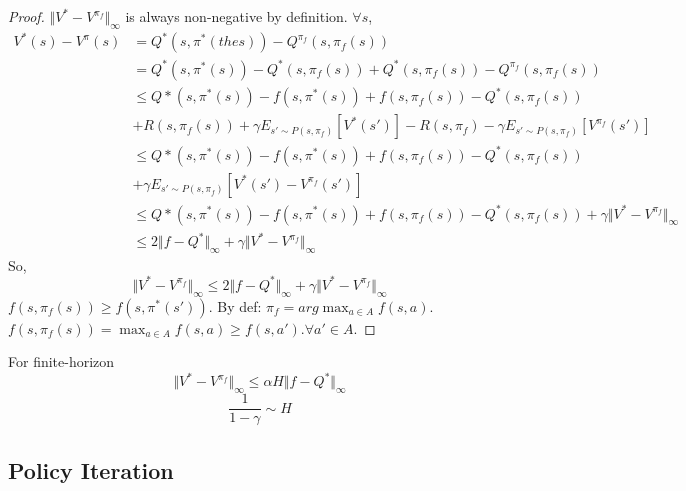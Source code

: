 \documentclass{report}
\begin{document}
\begin{proof}
$\Vert V^*-V^{\pi_f}\Vert_{\infty}$ is always non-negative by definition. $\forall s$, 
\begin{equation*}
\begin{split}
V^{*}(s)-V^{\pi}(s) &= Q^*(s,\pi^*(the s))-Q^{\pi_f}(s,\pi_f(s))\\
&= Q^*(s,\pi^*(s))-Q^*(s,\pi_f(s))+Q^*(s,\pi_f(s))-Q^{\pi_f}(s,\pi_f(s))\\
&\leq Q*(s,\pi^{*}(s))-f(s,\pi^{*}(s))+f(s,\pi_f(s))-Q^*(s,\pi_f(s))\\
& +R(s,\pi_f(s))+\gamma E_{s'\sim P(s,\pi_f)}[V^*(s')]-R(s,\pi_f) - \gamma E_{s'\sim P(s,\pi_f)}[V^{\pi_f}(s')] \\
&\leq Q*(s,\pi^{*}(s))-f(s,\pi^{*}(s))+f(s,\pi_f(s))-Q^*(s,\pi_f(s))\\
&+ \gamma E_{s'\sim P(s,\pi_f)}[V^*(s')-V^{\pi_f}(s')] \\
&\leq Q*(s,\pi^{*}(s))-f(s,\pi^{*}(s))+f(s,\pi_f(s))-Q^*(s,\pi_f(s)) + \gamma \Vert V^*-V^{\pi_f} \Vert_{\infty} \\
&\leq 2\Vert f-Q^*\Vert_{\infty} + \gamma \Vert V^*-V^{\pi_f} \Vert_{\infty}
\end{split}
\end{equation*}
So, \[
\Vert V^*-V^{\pi_f} \Vert_{\infty} \leq 2\Vert f-Q^*\Vert_{\infty} + \gamma \Vert V^*-V^{\pi_f} \Vert_{\infty}
\]
$f(s,\pi_f(s)) \geq f(s,\pi^*(s'))$. By def: $\pi_f=arg\max_{a\in A}f(s,a)$. $f(s,\pi_f(s))=\max_{a\in A}f(s,a) \geq f(s,a'). \forall a' \in A$.
\end{proof}
For finite-horizon \[\Vert  V^*-V^{ \pi_f} \Vert_{\infty} \leq \alpha H \Vert f-Q^{*}\Vert_{\infty}\]
\[\frac{1}{1-\gamma} \sim H\]
\subsection{Policy Iteration}
\end{document}
